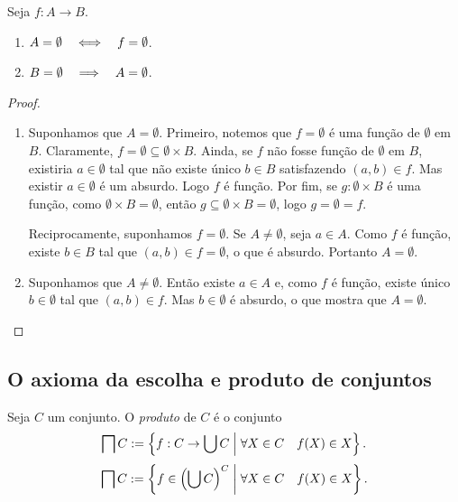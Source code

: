 \begin{proposition}
	Seja $f: A \to B$.
	\begin{enumerate}
	\item $A=\emptyset \quad \Longleftrightarrow \quad f=\emptyset$.
	\item $B=\emptyset \quad \Longrightarrow \quad A=\emptyset$.
	\end{enumerate}
\end{proposition}
\begin{proof}
	\begin{enumerate}
	\item Suponhamos que $A=\emptyset$. Primeiro, notemos que $f=\emptyset$ é uma função de $\emptyset$ em $B$. Claramente, $f = \emptyset \subseteq \emptyset \times B$. Ainda, se $f$ não fosse função de $\emptyset$ em $B$, existiria $a \in \emptyset$ tal que não existe único $b \in B$ satisfazendo $(a,b) \in f$. Mas existir $a \in \emptyset$ é um absurdo. Logo $f$ é função. Por fim, se $g: \emptyset \times B$ é uma função, como $\emptyset \times B = \emptyset$, então $g \subseteq \emptyset \times B = \emptyset$, logo $g=\emptyset=f$.

	Reciprocamente, suponhamos $f=\emptyset$. Se $A \neq \emptyset$, seja $a \in A$. Como $f$ é função, existe $b \in B$ tal que $(a,b) \in f=\emptyset$, o que é absurdo. Portanto $A=\emptyset$.

	\item Suponhamos que $A \neq \emptyset$. Então existe $a \in A$ e, como $f$ é função, existe único $b \in \emptyset$ tal que $(a,b) \in f$. Mas $b \in \emptyset$ é absurdo, o que mostra que $A = \emptyset$.
	\end{enumerate}
\end{proof}

\subsection*{O axioma da escolha e produto de conjuntos}

\begin{definition}
Seja $C$ um conjunto. O \emph{produto} de $C$ é o conjunto
	\begin{equation*}
	\prod C := \set{f: C \to \bigcup C }{\forall X \in C \quad f(X) \in X}.
	\end{equation*}
	\begin{equation*}
	\prod C := \set{f \in \left(\bigcup C\right)^C }{\forall X \in C \quad f(X) \in X}.
	\end{equation*}
\end{definition}

